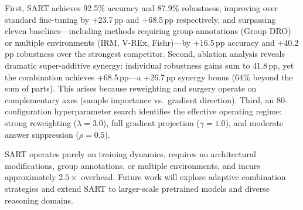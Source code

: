 \documentclass{article}
\begin{document}
First, SART achieves 92.5\% accuracy and 87.9\% robustness, improving over standard fine-tuning by +23.7\,pp and +68.5\,pp respectively, and surpassing eleven baselines---including methods requiring group annotations (Group DRO) or multiple environments (IRM, V-REx, Fishr)---by +16.5\,pp accuracy and +40.2\,pp robustness over the strongest competitor. Second, ablation analysis reveals dramatic super-additive synergy: individual robustness gains sum to 41.8\,pp, yet the combination achieves +68.5\,pp---a +26.7\,pp synergy bonus (64\% beyond the sum of parts). This arises because reweighting and surgery operate on complementary axes (sample importance vs.\ gradient direction). Third, an 80-configuration hyperparameter search identifies the effective operating regime: strong reweighting ($\lambda{=}3.0$), full gradient projection ($\gamma{=}1.0$), and moderate answer suppression ($\rho{=}0.5$).

SART operates purely on training dynamics, requires no architectural modifications, group annotations, or multiple environments, and incurs approximately $2.5{\times}$ overhead. Future work will explore adaptive combination strategies and extend SART to larger-scale pretrained models and diverse reasoning domains.




\end{document}
